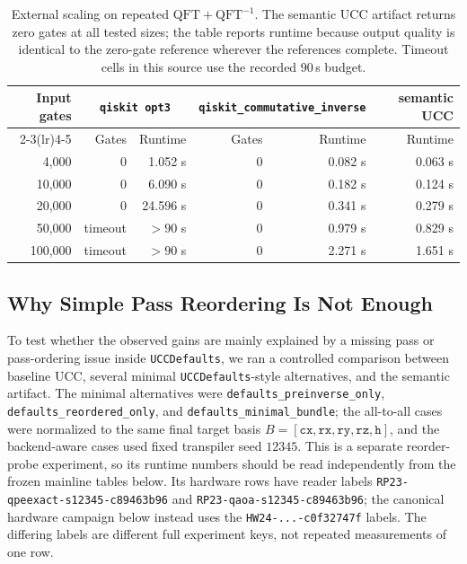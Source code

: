 \begin{table}[htbp]
\centering
\small
\begin{tabular}{rrrrrr}
\toprule
Input gates & \multicolumn{2}{c}{\texttt{qiskit opt3}} & \multicolumn{2}{c}{\texttt{qiskit\_commutative\_inverse}} & semantic UCC \\
\cmidrule(lr){2-3}\cmidrule(lr){4-5}
 & Gates & Runtime & Gates & Runtime & Runtime \\
\midrule
4{,}000 & 0 & 1.052 s & 0 & 0.082 s & 0.063 s \\
10{,}000 & 0 & 6.090 s & 0 & 0.182 s & 0.124 s \\
20{,}000 & 0 & 24.596 s & 0 & 0.341 s & 0.279 s \\
50{,}000 & timeout & $>90$ s & 0 & 0.979 s & 0.829 s \\
100{,}000 & timeout & $>90$ s & 0 & 2.271 s & 1.651 s \\
\bottomrule
\end{tabular}
\caption{External scaling on repeated $\mathrm{QFT}+\mathrm{QFT}^{-1}$. The semantic UCC artifact returns zero gates at all tested sizes; the table reports runtime because output quality is identical to the zero-gate reference wherever the references complete. Timeout cells in this source use the recorded 90\,s budget.}
\label{tab:qft-inverse-external-scaling}
\end{table}


\subsection{Why Simple Pass Reordering Is Not Enough}

To test whether the observed gains are mainly explained by a missing pass or
pass-ordering issue inside \texttt{UCCDefaults}, we ran a controlled comparison
between baseline UCC, several minimal \texttt{UCCDefaults}-style alternatives,
and the semantic artifact. The minimal alternatives were
\texttt{defaults\_preinverse\_only}, \texttt{defaults\_reordered\_only}, and
\texttt{defaults\_minimal\_bundle}; the all-to-all cases were normalized to the
same final target basis $B = [\texttt{cx},\texttt{rx},\texttt{ry},\texttt{rz},\texttt{h}]$,
and the backend-aware cases used fixed transpiler seed $12345$. This is a
separate reorder-probe experiment, so its runtime numbers should be read
independently from the frozen mainline tables below.  Its hardware rows have
reader labels \texttt{RP23-qpeexact-s12345-c89463b96} and
\texttt{RP23-qaoa-s12345-c89463b96}; the canonical hardware campaign below
instead uses the \texttt{HW24-...-c0f32747f} labels.  The differing labels are
different full experiment keys, not repeated measurements of one row.

